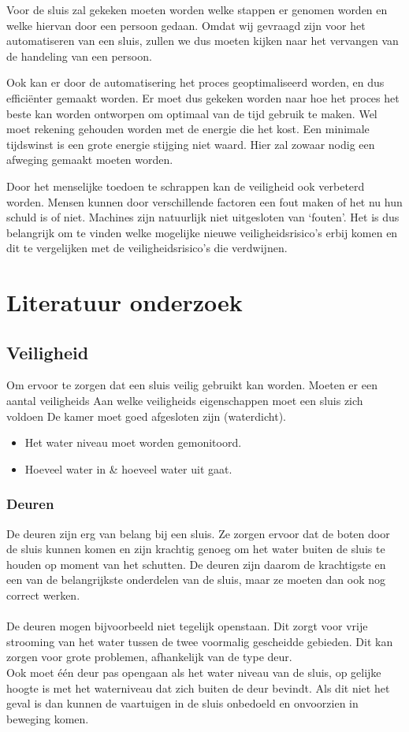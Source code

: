 \documentclass{article}
\begin{document}
Voor de sluis zal gekeken moeten worden welke stappen er genomen worden en welke hiervan door een persoon gedaan. Omdat wij gevraagd zijn voor het automatiseren van een sluis, zullen we dus moeten kijken naar het vervangen van de handeling van een persoon.

Ook kan er door de automatisering het proces geoptimaliseerd worden, en dus efficiënter gemaakt worden. Er moet dus gekeken worden naar hoe het proces het beste kan worden ontworpen om optimaal van de tijd gebruik te maken. Wel moet rekening gehouden worden met de energie die het kost. Een minimale tijdswinst is een grote energie stijging niet waard. Hier zal zowaar nodig een afweging gemaakt moeten worden.

Door het menselijke toedoen te schrappen kan de veiligheid ook verbeterd worden. Mensen kunnen door verschillende factoren een fout maken of het nu hun schuld is of niet. Machines zijn natuurlijk niet uitgesloten van ‘fouten’. Het is dus belangrijk om te vinden welke mogelijke nieuwe veiligheidsrisico’s erbij komen en dit te vergelijken met de veiligheidsrisico’s die verdwijnen.


\clearpage %
\section{Literatuur onderzoek} %

\subsection{Veiligheid}
Om ervoor te zorgen dat een sluis veilig gebruikt kan worden. Moeten er een aantal veiligheids 
Aan welke veiligheids eigenschappen moet een sluis zich voldoen
De kamer moet goed afgesloten zijn (waterdicht).
\begin{itemize}
\item Het water niveau moet worden gemonitoord.
\item Hoeveel water in \& hoeveel water uit gaat.
\end{itemize}

\subsubsection{Deuren}
De deuren zijn erg van belang bij een sluis. Ze zorgen ervoor dat de boten door de sluis kunnen komen en zijn krachtig genoeg om het water buiten de sluis te houden op moment van het schutten. De deuren zijn daarom de krachtigste en een van de belangrijkste onderdelen van de sluis, maar ze moeten dan ook nog correct werken.
\\\\
De deuren mogen bijvoorbeeld niet tegelijk openstaan. Dit zorgt voor vrije strooming van het water tussen de twee voormalig gescheidde gebieden. Dit kan zorgen voor grote problemen, afhankelijk van de type deur.\\
Ook moet één deur pas opengaan als het water niveau van de sluis, op gelijke hoogte is met het waterniveau dat zich buiten de deur bevindt. Als dit niet het geval is dan kunnen de vaartuigen in de sluis onbedoeld en onvoorzien in beweging komen.
\end{document}

